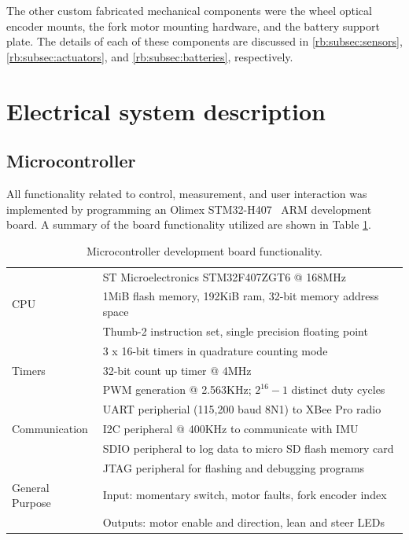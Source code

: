 The other custom fabricated mechanical components were the wheel optical
encoder mounts, the fork motor mounting hardware, and the battery support
plate.  The details of each of these components are discussed in
\ref{rb:subsec:sensors}, \ref{rb:subsec:actuators}, and
\ref{rb:subsec:batteries}, respectively.

\section{Electrical system description} \label{rb:sec:elec}
\subsection{Microcontroller} \label{rb:subsec:mcu}
All functionality related to control, measurement, and user interaction was
implemented by programming an Olimex STM32-H407~\cite{OlimexSTM32H407} ARM
development board. A summary of the board functionality utilized are shown in
Table \ref{rb:tab:mcu}.
\begin{table}[h]
  \centering
  \begin{tabular}{|l|l|}
    \hline
        & ST Microelectronics STM32F407ZGT6 @ 168MHz \\
    CPU & 1MiB flash memory, 192KiB ram, 32-bit memory address space \\
        & Thumb-2 instruction set, single precision floating point \\
    \hline
           & 3 x 16-bit timers in quadrature counting mode \\
    Timers & 32-bit count up timer @ 4MHz \\
           & PWM generation @ 2.563KHz; $2^{16} - 1$ distinct duty cycles \\
    \hline
                   & UART peripherial (115,200 baud 8N1) to XBee Pro radio \\
    Communication  & I2C peripheral @ 400KHz to communicate with IMU \\
                   & SDIO peripheral to log data to micro SD flash memory card \\
                   & JTAG peripheral for flashing and debugging programs \\
    \hline
    General Purpose & Input: momentary switch, motor faults, fork encoder index \\
                    & Outputs: motor enable and direction, lean and steer LEDs \\
    \hline
  \end{tabular}
  \caption{Microcontroller development board functionality.}
  \label{rb:tab:mcu}
\end{table}
